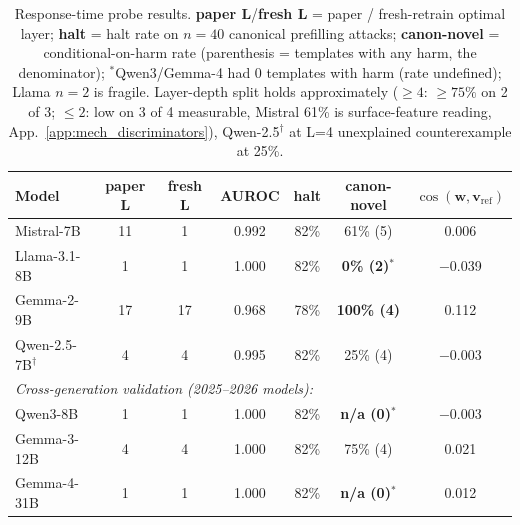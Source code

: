 \documentclass{article}
\begin{document}
\begin{table}[t]
\caption{Response-time probe results. \textbf{paper L}/\textbf{fresh L} = paper / fresh-retrain optimal layer; \textbf{halt} = halt rate on $n=40$ canonical prefilling attacks; \textbf{canon-novel} = conditional-on-harm rate (parenthesis = templates with any harm, the denominator); $^*$Qwen3/Gemma-4 had 0 templates with harm (rate undefined); Llama $n=2$ is fragile. Layer-depth split holds approximately ($\geq 4$: $\geq 75\%$ on 2 of 3; $\leq 2$: low on 3 of 4 measurable, Mistral 61\% is surface-feature reading, App.~\ref{app:mech_discriminators}), Qwen-2.5$^\dagger$ at L=4 unexplained counterexample at 25\%.}
\label{tab:response_probe}
\centering
\small
\begin{tabular}{lcccccc}
\toprule
\textbf{Model} & \textbf{paper L} & \textbf{fresh L} & \textbf{AUROC} & \textbf{halt} & \textbf{canon-novel} & $\cos(\mathbf{w}, \mathbf{v}_\text{ref})$ \\
\midrule
Mistral-7B     & 11 & 1  & 0.992 & 82\% & 61\% (5)  & 0.006 \\
Llama-3.1-8B   & 1  & 1  & 1.000 & 82\% & \textbf{0\% (2)$^*$}  & $-$0.039 \\
Gemma-2-9B     & 17 & 17 & 0.968 & 78\% & \textbf{100\% (4)} & 0.112 \\
Qwen-2.5-7B$^\dagger$    & 4  & 4  & 0.995 & 82\% & 25\% (4)  & $-$0.003 \\
\midrule
\multicolumn{7}{l}{\emph{Cross-generation validation (2025--2026 models):}} \\
Qwen3-8B       & 1  & 1  & 1.000 & 82\% & \textbf{n/a (0)$^*$}  & $-$0.003 \\
Gemma-3-12B    & 4  & 4  & 1.000 & 82\% & 75\% (4)  & 0.021 \\
Gemma-4-31B    & 1  & 1  & 1.000 & 82\% & \textbf{n/a (0)$^*$}  & 0.012 \\
\bottomrule
\end{tabular}
\end{table}
\end{document}
